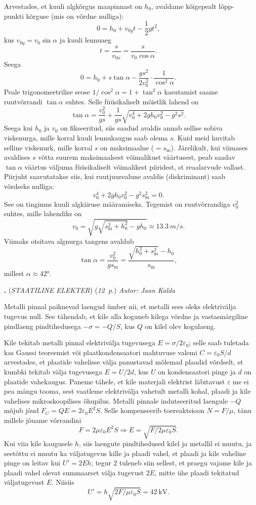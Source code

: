 \documentclass[11pt,a5paper]{article}
\newcommand{\numb}[1]{\vspace{5pt}\textbf{\large #1}}
\newcommand{\nimi}[1]{(\textsl{\small \uppercase{#1}})}
\newcommand{\punktid}[1]{(\emph{#1~p.})}
\newcounter{ylesanne}
\newcommand{\yl}[1]{\addtocounter{ylesanne}{1}\numb{\theylesanne.} \nimi{#1} \newblock{}}
\newcommand{\autor}[1]{\emph{Autor: #1}}%
\begin{document}
Arvestades, et kuuli algkõrgus maapinnast on $h_0$, avaldame kõigepealt lõpp-punkti kõrguse (mis on võrdne nulliga):
\[
0=h_0+v_{0y}t-\frac{1}{2}gt^2,
\]
kus $v_{0y}=v_0\sin\alpha$ ja kuuli lennuaeg
\[
t=\frac{s}{v_{0x}}=\frac{s}{v_0\cos\alpha}.
\]
Seega
\[
0=h_0+s\tan\alpha-\frac{gs^2}{2v_0^2}\cdot\frac{1}{\cos^2\alpha}.
\]
Peale trigonomeetrilise seose $1/\cos^2\alpha=1+\tan^2\alpha$ kasutamist saame ruutvõrrandi $\tan\alpha$ suhtes. Selle füüsikaliselt mõistlik lahend on
\[
\tan\alpha=\frac{v_0^2}{gs}+\frac{1}{gs}\sqrt{v_0^4+2gh_0v_0^2-g^2s^2}.
\]
Seega kui $h_0$ ja $v_0$ on fikseeritud, siis saadud avaldis annab sellise sobiva viskenurga, mille korral kuuli lennukaugus saab olema $s$. Kuid meid huvitab selline viskenurk, mille korral $s$ on maksimaalne ($=s_\text{m}$). Järelikult, kui viimases avaldises $s$ võtta suurem maksimaalsest võimalikust väärtusest, peab saadav $\tan\alpha$ väärtus väljuma füüsikaliselt võimalikest piiridest, st reaalarvude vallast. Piirjuht saavutatakse siis, kui ruutjuurealune avaldis (diskriminant) saab võrdseks nulliga:
\[
v_0^4+2gh_0v_0^2-g^2s_\text{m}^2=0.
\]
See on tingimus kuuli algkiiruse määramiseks. Tegemist on ruutvõrrandiga $v_0^2$ suhtes, mille lahendiks on
\[
v_0=\sqrt{g\sqrt{s_\text{m}^2+h_0^2}-gh_0}\approx \SI{13.3}{m/s}.
\]
Viimaks otsitava algnurga tangens avaldub
\[
\tan\alpha=\frac{v_0^2}{gs_\text{m}}=\frac{\sqrt{h_0^2+s_\text{m}^2}-h_0}{s_\text{m}},
\]
millest $\alpha\approx\ang{42}$.

\yl{Staatiline elekter}
\punktid{12} \autor{Jaan Kalda}\par
Metalli pinnal paiknevad laengud ümber nii, et metalli sees oleks elektrivälja tugevus null. See tähendab, et kile alla koguneb kilega võrdne ja vastasmärgiline pindlaeng pindtihedusega $-\sigma=-Q/S$, kus $Q$ on kilel olev kogulaeng.

Kile tekitab metalli pinnal elektrivälja tugevusega $E=\sigma/2\varepsilon_0$; selle saab tuletada kas Gaussi teoreemist või plaatkondensaatori mahtuvuse valemi $C=\varepsilon_0 S/d$ arvestades, et plaatide vahelisse välja panustavad mõlemad plaadid võrdselt, st kumbki tekitab välja tugevusega $E=U/2d$, kus $U$ on kondensaatori pinge ja $d$ on plaatide vahekaugus. Paneme tähele, et kile materjali elektrist läbitavust $\varepsilon$ me ei pea mängu tooma, sest vaatleme elektrivälja vahetult metalli kohal, plaadi ja kile vahelises mikroskoopilises õhupilus. Metalli pinnale indutseeritud laengule $-Q$ mõjub jõud $F_C=QE=2\varepsilon_0E^2S$. Selle kompenseerib toereaktsioon $N=F/\mu$, tänu millele jõuame võrrandini
\[
  F=2\mu\varepsilon_0E^2S\Rightarrow E=\sqrt{F/2\mu\varepsilon_0S}.
\]
Kui viia kile kaugusele $h$, siis laengute pindtihedused kilel ja metallil ei muutu, ja seetõttu ei muutu ka väljatugevus kille ja plaadi vahel, st plaadi ja kile vaheline pinge on leitav kui $U'=2Eh$; tegur 2 tuleneb siin sellest, et praegu vajame kile ja plaadi vahel olevat summaarset välja tugevust $2E$, mitte ühe plaadi tekitatud väljatugevust $E$. Niisiis
\[
  U'=h\sqrt{2F/\mu\varepsilon_0S}=\SI{42}{\kV}.
\]
\end{document}
